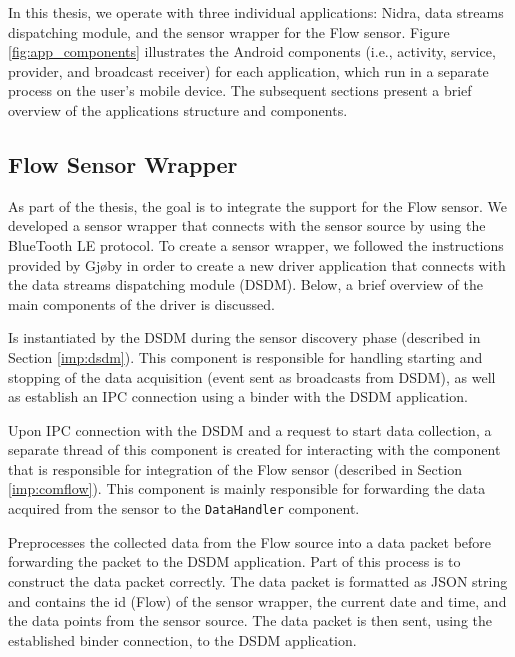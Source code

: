 In this thesis, we operate with three individual applications: Nidra, data streams dispatching module, and the sensor wrapper for the Flow sensor. Figure \ref{fig:app_components} illustrates the Android components (i.e., activity, service, provider, and broadcast receiver) for each application, which run in a separate process on the user's mobile device. The subsequent sections present a brief overview of the applications structure and components.


\subsection{Flow Sensor Wrapper}
As part of the thesis, the goal is to integrate the support for the Flow sensor. We developed a sensor wrapper that connects with the sensor source by using the BlueTooth LE protocol. To create a sensor wrapper, we followed the instructions provided by Gjøby in order to create a new driver application that connects with the data streams dispatching module (DSDM). Below, a brief overview of the main components of the driver is discussed.

\begin{description}[font=\normalfont\itshape]
    \item[WrapperService:] Is instantiated by the DSDM during the sensor discovery phase (described in Section \ref{imp:dsdm}). This component is responsible for handling starting and stopping of the data acquisition (event sent as broadcasts from DSDM), as well as establish an IPC connection using a binder with the DSDM application. 
    \item[CommunicationHandler:] Upon IPC connection with the DSDM and a request to start data collection, a separate thread of this component is created for interacting with the component that is responsible for integration of the Flow sensor (described in Section \ref{imp:comflow}). This component is mainly responsible for forwarding the data acquired from the sensor to the \verb|DataHandler| component. 
    \item[DataHandler:] Preprocesses the collected data from the Flow source into a data packet before forwarding the packet to the DSDM application. Part of this process is to construct the data packet correctly. The data packet is formatted as JSON string and contains the id (Flow) of the sensor wrapper, the current date and time, and the data points from the sensor source. The data packet is then sent, using the established binder connection, to the DSDM application.
\end{description}

